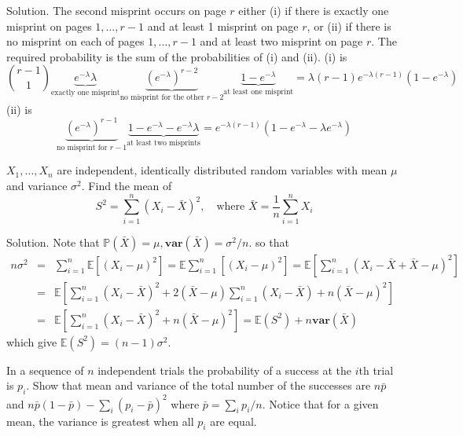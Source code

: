 Solution. The second misprint occurs on page $r$ either (i) if there is exactly one misprint on pages $1,\dots,r-1$ and at least 1 misprint on page $r$, or (ii) if there is no misprint on each of pages $1,\dots,r-1$ and at least two misprint on page $r$. The required probability is the sum of the probabilities of (i) and (ii). (i) is 
\begin{equation}
\binom{r-1}{1}\underbrace{e^{-\lambda}\lambda}_{\text{exactly one misprint}}\underbrace{\left(e^{-\lambda}\right)^{r-2}}_{\text{no misprint for the other }r-2} \underbrace{1-e^{-\lambda}}_{\text{at least one misprint}} = \lambda(r-1)e^{-\lambda(r-1)}\left(1-e^{-\lambda}\right)
\end{equation}
(ii) is 
\begin{equation}
\underbrace{\left(e^{-\lambda}\right)^{r-1}}_{\text{no misprint for }r-1} \underbrace{1-e^{-\lambda}-e^{-\lambda}\lambda}_{\text{at least two misprints}} = e^{-\lambda(r-1)}\left(1-e^{-\lambda}-\lambda e^{-\lambda}\right)
\end{equation}


\item $X_1,\dots,X_n$ are independent, identically distributed random variables with mean $\mu$ and variance $\sigma^2$. Find the mean of 
\begin{equation}
S^2=\sum^n_{i=1}(X_i-\bar{X})^2, \quad \text{where }\bar{X}=\frac{1}{n}\sum^n_{i=1}X_i
\end{equation}



Solution. Note that $\mathbb{P}(\bar{X})=\mu, \mathbf{var}(\bar{X})=\sigma^2/n$. so that
\begin{eqnarray}
n\sigma^2 & = & \sum^n_{i=1}\mathbb{E}\left[(X_i-\mu)^2\right] = \mathbb{E}\sum^n_{i=1}\left[(X_i-\mu)^2\right] = \mathbb{E}\left[\sum^n_{i=1}(X_i-\bar{X}+\bar{X}-\mu)^2\right]\nonumber\\
& = & \mathbb{E}\left[\sum^n_{i=1}(X_i-\bar{X})^2 +2(\bar{X}-\mu)\sum^n_{i=1}(X_i-\bar{X}) + n(\bar{X}-\mu)^2\right]\nonumber\\
& = & \mathbb{E}\left[\sum^n_{i=1}(X_i-\bar{X})^2 + n(\bar{X}-\mu)^2\right] = \mathbb{E}(S^2) + n\mathbf{var}(\bar{X})
\end{eqnarray}
which give $\mathbb{E}(S^2) = (n-1)\sigma^2$.


\item In a sequence of $n$ independent trials the probability of a success at the $i$th trial is $p_i$. Show that mean and variance of the total number of the successes are $n\bar{p}$ and $n\bar{p}(1-\bar{p})-\sum_i(p_i-\bar{p})^2$ where $\bar{p}=\sum_ip_i/n$. Notice that for a given mean, the variance is greatest when all $p_i$ are equal.



